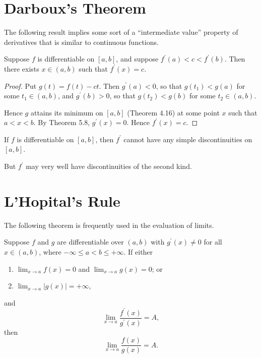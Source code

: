 \section{Darboux's Theorem}
The following result implies some sort of a ``intermediate value'' property of derivatives that is similar to continuous functions.

\begin{theorem}
Suppose $f$ is differentiable on $[a,b]$, and suppose $f^\prime(a)<c<f^\prime(b)$. Then there exists $x\in(a,b)$ such that $f^\prime(x)=c$.
\end{theorem}

\begin{proof}
Put $g(t)=f(t)-ct$. Then $g^\prime(a)<0$, so that $g(t_1)<g(a)$ for some $t_1\in(a,b)$, and $g^\prime(b)>0$, so that $g(t_2)<g(b)$ for some $t_2\in(a,b)$.

Hence $g$ attains its minimum on $[a,b]$ (Theorem 4.16) at some point $x$ such that $a<x<b$. By Theorem 5.8, $g^\prime(x)=0$. Hence $f^\prime(x)=c$.
\end{proof}

\begin{corollary}
If $f$ is differentiable on $[a,b]$, then $f^\prime$ cannot have any simple discontinuities on $[a,b]$.
\end{corollary}

\begin{remark}
But $f^\prime$ may very well have discontinuities of the second kind.
\end{remark}

\section{L'Hopital's Rule}
The following theorem is frequently used in the evaluation of limits.

\begin{theorem}
Suppose $f$ and $g$ are differentiable over $(a,b)$ with $g^\prime(x)\neq0$ for all $x\in(a,b)$, where $-\infty\le a<b\le+\infty$. If either
\begin{enumerate}[label=(\arabic*)]
\item $\displaystyle\lim_{x\to a}f(x)=0$ and $\displaystyle\lim_{x\to a}g(x)=0$; or
\item $\displaystyle\lim_{x\to a}|g(x)|=+\infty$,
\end{enumerate}
and
\[\lim_{x\to a}\frac{f^\prime(x)}{g^\prime(x)}=A,\]
then
\[\lim_{x\to a}\frac{f(x)}{g(x)}=A.\]
\end{theorem}

